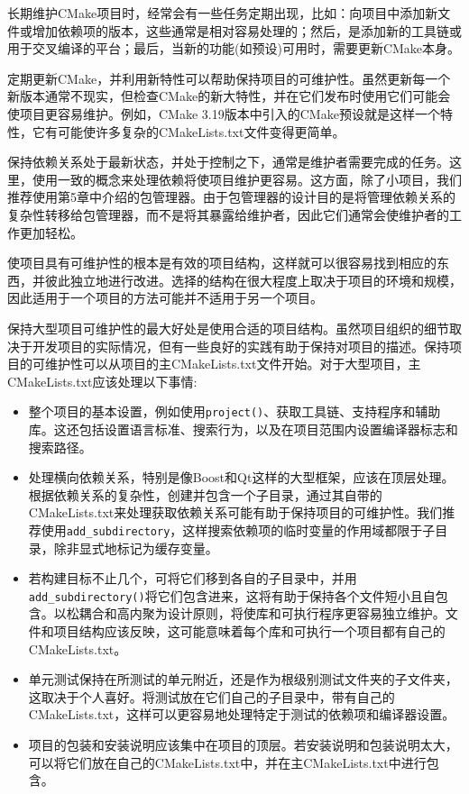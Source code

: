 长期维护CMake项目时，经常会有一些任务定期出现，比如：向项目中添加新文件或增加依赖项的版本，这些通常是相对容易处理的；然后，是添加新的工具链或用于交叉编译的平台；最后，当新的功能(如预设)可用时，需要更新CMake本身。

定期更新CMake，并利用新特性可以帮助保持项目的可维护性。虽然更新每一个新版本通常不现实，但检查CMake的新大特性，并在它们发布时使用它们可能会使项目更容易维护。例如，CMake 3.19版本中引入的CMake预设就是这样一个特性，它有可能使许多复杂的CMakeLists.txt文件变得更简单。

保持依赖关系处于最新状态，并处于控制之下，通常是维护者需要完成的任务。这里，使用一致的概念来处理依赖将使项目维护更容易。这方面，除了小项目，我们推荐使用第5章中介绍的包管理器。由于包管理器的设计目的是将管理依赖关系的复杂性转移给包管理器，而不是将其暴露给维护者，因此它们通常会使维护者的工作更加轻松。

使项目具有可维护性的根本是有效的项目结构，这样就可以很容易找到相应的东西，并彼此独立地进行改进。选择的结构在很大程度上取决于项目的环境和规模，因此适用于一个项目的方法可能并不适用于另一个项目。

保持大型项目可维护性的最大好处是使用合适的项目结构。虽然项目组织的细节取决于开发项目的实际情况，但有一些良好的实践有助于保持对项目的描述。保持项目的可维护性可以从项目的主CMakeLists.txt文件开始。对于大型项目，主CMakeLists.txt应该处理以下事情:

\begin{itemize}
\item 
整个项目的基本设置，例如使用\texttt{project()}、获取工具链、支持程序和辅助库。这还包括设置语言标准、搜索行为，以及在项目范围内设置编译器标志和搜索路径。

\item 
处理横向依赖关系，特别是像Boost和Qt这样的大型框架，应该在顶层处理。根据依赖关系的复杂性，创建并包含一个子目录，通过其自带的CMakeLists.txt来处理获取依赖关系可能有助于保持项目的可维护性。我们推荐使用\texttt{add\_subdirectory}，这样搜索依赖项的临时变量的作用域都限于子目录，除非显式地标记为缓存变量。

\item 
若构建目标不止几个，可将它们移到各自的子目录中，并用\texttt{add\_subdirectory()}将它们包含进来，这将有助于保持各个文件短小且自包含。以松耦合和高内聚为设计原则，将使库和可执行程序更容易独立维护。文件和项目结构应该反映，这可能意味着每个库和可执行一个项目都有自己的CMakeLists.txt。

\item 
单元测试保持在所测试的单元附近，还是作为根级别测试文件夹的子文件夹，这取决于个人喜好。将测试放在它们自己的子目录中，带有自己的CMakeLists.txt，这样可以更容易地处理特定于测试的依赖项和编译器设置。

\item 
项目的包装和安装说明应该集中在项目的顶层。若安装说明和包装说明太大，可以将它们放在自己的CMakeLists.txt中，并在主CMakeLists.txt中进行包含。
\end{itemize}

